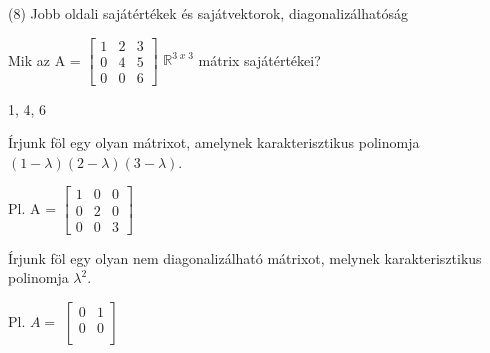 \begin{frame}[plain]
\begin{tcolorbox}[center, colback={myyellow}, coltext={black}, colframe={myyellow}]
    {\RHuge  (8) Jobb oldali sajátértékek és sajátvektorok, diagonalizálhatóság}
    \mmedskip
\end{tcolorbox}
\end{frame}

\begin{frame}
  \begin{tcolorbox}[title={8/1. {\symknight}}]
    Mik az A = $\begin{bmatrix} 
  				1 & 2 & 3 \\
  				0 & 4 & 5 \\
  				0 & 0 & 6
			\end{bmatrix}$ $\mathbb{R}^{3 \; x \; 3}$ mátrix sajátértékei? 

  \tcblower

    \mmedskip 
    
    1, 4, 6
  \end{tcolorbox}
\end{frame}


\begin{frame}
  \begin{tcolorbox}[title={8/2. {\symknight}}]
     Írjunk föl egy olyan mátrixot, amelynek karakterisztikus polinomja $(1-{\lambda})(2-{\lambda})(3-{\lambda})$.

  \tcblower

    \mmedskip 
    
     Pl. A = $\begin{bmatrix} 
  				1 & 0 & 0 \\
  				0 & 2 & 0 \\
  				0 & 0 & 3
			\end{bmatrix}$
  \end{tcolorbox}
\end{frame}


\begin{frame}
  \begin{tcolorbox}[title={8/3. {\symrook}}]
    Írjunk föl egy olyan nem diagonalizálható mátrixot, melynek karakterisztikus polinomja ${\lambda}^2$.

  \tcblower

    \mmedskip 
    
    Pl. $A =$ $\begin{bmatrix} 
  				0 & 1 \\
  				0 & 0 \\
			\end{bmatrix}$
  \end{tcolorbox}
\end{frame}


